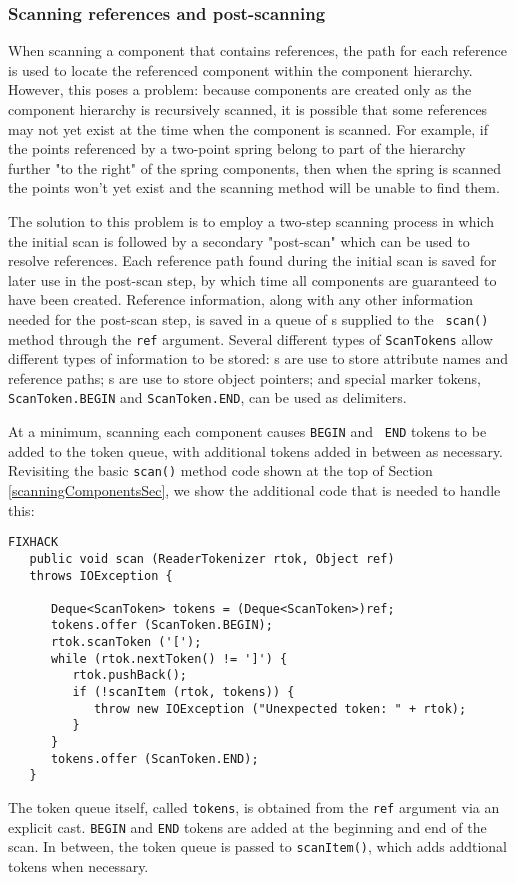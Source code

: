 \documentclass{article}
\begin{document}
\subsubsection{Scanning references and post-scanning}
\label{scanningReferencesSec}

When scanning a component that contains references, the path for each
reference is used to locate the referenced component within
the component hierarchy.
However, this poses a problem: because components are
created only as the component hierarchy is recursively scanned, it is
possible that some references may not yet exist at
the time when the component is scanned. For example, if the points
referenced by a two-point spring belong to part of the hierarchy
further "to the right" of the spring components, then when the
spring is scanned the points won't yet exist and the scanning method
will be unable to find them.

The solution to this problem is to employ a two-step scanning process
in which the initial scan is followed by a secondary "post-scan" which
can be used to resolve references. Each reference path found during
the initial scan is saved for later use in the post-scan step, by
which time all components are guaranteed to have been
created. Reference information, along with any other information
needed for the post-scan step, is saved in a queue of
s supplied to the {\tt
scan()} method through the {\tt ref} argument. Several different types
of {\tt ScanTokens} allow different types of information to be stored:
s are use to store
attribute names and reference paths;
s are use to store object
pointers; and special marker tokens, {\tt ScanToken.BEGIN}
and {\tt ScanToken.END}, can be used as delimiters.

At a minimum, scanning each component causes {\tt BEGIN} and {\tt
END} tokens to be added to the token queue, with additional
tokens added in between as necessary.
Revisiting the basic {\tt scan()} method code
shown at the top of Section \ref{scanningComponentsSec},
we show the additional code that is needed to handle this:
\begin{lstlisting}FIXHACK
   public void scan (ReaderTokenizer rtok, Object ref) 
   throws IOException {

      Deque<ScanToken> tokens = (Deque<ScanToken>)ref;
      tokens.offer (ScanToken.BEGIN);
      rtok.scanToken ('[');
      while (rtok.nextToken() != ']') {
         rtok.pushBack();
         if (!scanItem (rtok, tokens)) {
            throw new IOException ("Unexpected token: " + rtok);
         }
      }
      tokens.offer (ScanToken.END);
   }
\end{lstlisting}
The token queue itself, called {\tt tokens}, is obtained from the
{\tt ref} argument via an explicit cast.
{\tt BEGIN} and {\tt END} tokens are added at the
beginning and end of the scan. In between, the token queue
is passed to {\tt scanItem()}, which adds addtional tokens
when necessary. 
\end{document}
